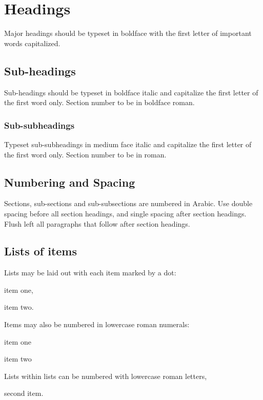 \documentclass[twoside]{article}
\begin{document}
\section{Headings}
\noindent
Major headings should be typeset in boldface with the first
letter of important words capitalized.

\subsection{Sub-headings}
\noindent
Sub-headings should be typeset in boldface italic and capitalize
the first letter of the first word only. Section number to be in
boldface roman.

\subsubsection{Sub-subheadings}
\noindent
Typeset sub-subheadings in medium face italic and capitalize the
first letter of the first word only. Section number to be in
roman.

\subsection{Numbering and Spacing}
\noindent
Sections, sub-sections and sub-subsections are numbered in
Arabic.  Use double spacing before all section headings, and
single spacing after section headings. Flush left all paragraphs
that follow after section headings.

\subsection{Lists of items}
\noindent
Lists may be laid out with each item marked by a dot:
\begin{itemlist}
 \item item one,
 \item item two.
\end{itemlist}
Items may also be numbered in lowercase roman numerals:
\begin{romanlist}
 \item item one
 \item item two
          \begin{alphlist}
          \item Lists within lists can be numbered with lowercase
              roman letters,
          \item second item.
          \end{alphlist}
\end{romanlist}
\end{document}
